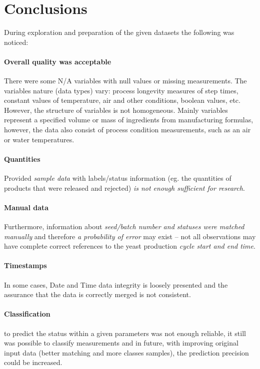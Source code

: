 \section{Conclusions}
During exploration and preparation of the given datasets the following was noticed:

\paragraph{Overall quality was acceptable} There were some N/A variables with null values or missing measurements. The variables nature (data types) vary: process longevity measures of step times, constant values of temperature, air and other conditions, boolean values, etc. However, the structure of variables is not homogeneous. Mainly variables represent a specified volume or mass of ingredients from manufacturing formulas, however, the data also consist of process condition measurements, such as an air or water temperatures.
    
\paragraph{Quantities} Provided \emph{sample data} with labels/status information (eg. the quantities of products that were released and rejected) \emph{is not enough sufficient for research}. 
    
\paragraph{Manual data} Furthermore, information about \emph{seed/batch number and statuses were matched manually} and therefore \emph{a probability of error} may exist – not all observations may have complete correct references to the yeast production \emph{cycle start and end time}.
    
\paragraph{Timestamps} In some cases, Date and Time data integrity is loosely presented and the assurance that the data is correctly merged is not consistent.
    
\paragraph{Classification} to predict the status within a given parameters was not enough reliable, it still was possible to classify measurements and in future, with improving original input data (better matching and more classes samples), the prediction precision could be increased.  

